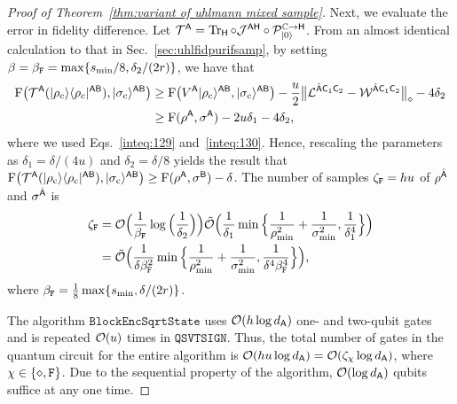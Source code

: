 \begin{proof}[Proof of Theorem~\ref{thm:variant of uhlmann mixed sample}]
Next, we evaluate the error in fidelity difference.
Let ${\mathcal{T}}^{\mathsf{A}} = \operatorname{Tr}_{\mathsf{H}}\circ {\mathcal{J}}^{{\mathsf{A}}{\mathsf{H}}} \circ {\mathcal{P}}_{|0\rangle}^{\mathbb{C}\rightarrow{\mathsf{H}}}$.
From an almost identical calculation to that in Sec.~\ref{sec:uhlfidpurifsamp}, by setting $\beta = \beta_{\mathtt{F}} = \max\{s_{\rm min}/8, \delta_2/(2r)\}$, we have that
\begin{align}
    {\mathrm{F}}\big({\mathcal{T}}^{\mathsf{A}}(|\rho_{\rm c}\rangle\langle\rho_{\rm c}|^{{\mathsf{A}}{\mathsf{B}}}), |\sigma_{\rm c}\rangle^{{\mathsf{A}}{\mathsf{B}}}\big)
    &\geq {\mathrm{F}}\big(V^{\mathsf{A}}|\rho_{\rm c}\rangle^{{\mathsf{A}}{\mathsf{B}}}, |\sigma_{\rm c}\rangle^{{\mathsf{A}}{\mathsf{B}}}\big) - \frac{u}{2}\big\|{\mathcal{L}}^{\hat{{\mathsf{A}}}{\mathsf{C}}_1{\mathsf{C}}_2} - {\mathcal{W}}^{\hat{{\mathsf{A}}}{\mathsf{C}}_1{\mathsf{C}}_2}\big\|_\diamond -4\delta_2 \\
    &\geq {\mathrm{F}}(\rho^{\mathsf{A}}, \sigma^{\mathsf{A}}) - 2u\delta_1 - 4\delta_2,
\end{align}
where we used Eqs.~\eqref{inteq:129} and~\eqref{inteq:130}.
Hence, rescaling the parameters as $\delta_1 = \delta/(4u)$ and $\delta_2 = \delta/8$ yields
the result that ${\mathrm{F}}\big({\mathcal{T}}^{\mathsf{A}}(|\rho_{\rm c}\rangle\langle\rho_{\rm c}|^{{\mathsf{A}}{\mathsf{B}}}), |\sigma_{\rm c}\rangle^{{\mathsf{A}}{\mathsf{B}}}\big) \geq {\mathrm{F}}(\rho^{\mathsf{A}}, \sigma^{\mathsf{B}}) -\delta$.
The number of samples $\zeta_{\mathtt{F}} = hu$ of $\rho^{\hat{{\mathsf{A}}}}$ and $\sigma^{\hat{{\mathsf{A}}}}$ is
\begin{align}
    \zeta_{\mathtt{F}} 
    &= {\mathcal{O}}\Big(\frac{1}{\beta_{\mathtt{F}}}\log{\Big(\frac{1}{\delta_2}\Big)}\Big)\tilde{{\mathcal{O}}}\Big(\frac{1}{\delta_1}\min\Big\{\frac{1}{\rho_{\rm min}^2} + \frac{1}{\sigma_{\rm min}^2}, \frac{1}{\delta_1^4}\Big\}\Big) \\
    &=\tilde{{\mathcal{O}}}\Big(\frac{1}{\delta\beta_{\mathtt{F}}^2}\min\Big\{\frac{1}{\rho_{\rm min}^2} + \frac{1}{\sigma_{\rm min}^2}, \frac{1}{\delta^4\beta_{\mathtt{F}}^4}\Big\}\Big),
\end{align}
where $\beta_{\mathtt{F}} = \frac{1}{8}\max\{s_{\rm min}, \delta/(2r)\}$.

The algorithm $\mathtt{BlockEncSqrtState}$ uses ${\mathcal{O}}(h\log{d_{\mathsf{A}}})$ one- and two-qubit gates and is repeated ${\mathcal{O}}(u)$ times in $\mathtt{QSVTSIGN}$.
Thus, the total number of gates in the quantum circuit for the entire algorithm is ${\mathcal{O}}(hu\log{d_{\mathsf{A}}}) = {\mathcal{O}}(\zeta_\chi\log{d_{\mathsf{A}}})$, where $\chi \in \{\diamond, \mathtt{F}\}$.
Due to the sequential property of the algorithm, ${\mathcal{O}}(\log{d_{\mathsf{A}}})$ qubits suffice at any one time.



\end{proof}















